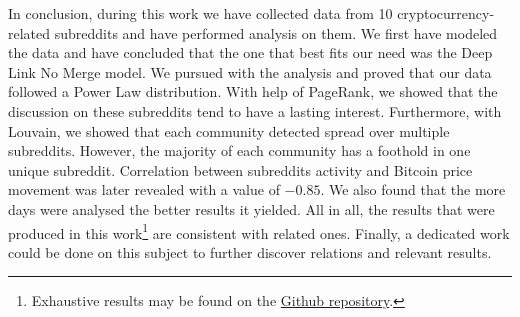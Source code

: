In conclusion, during this work we have collected data from 10 cryptocurrency-related subreddits and have performed analysis on them. We first have modeled the data and have concluded that the one that best fits our need was the Deep Link No Merge model. We pursued with the analysis and proved that our data followed a Power Law distribution. With help of PageRank, we showed that the discussion on these subreddits tend to have a lasting interest. Furthermore, with Louvain, we showed that each community detected spread over multiple subreddits. However, the majority of each community has a foothold in one unique subreddit. Correlation between subreddits activity and Bitcoin price movement was later revealed with a value of $-0.85$. We also found that the more days were analysed the better results it yielded. All in all, the results that were produced in this work\footnote{Exhaustive results may be found on the \href{https://github.com/fwicht/sma-project}{Github repository}.} are consistent with related ones. Finally, a dedicated work could be done on this subject to further discover relations and relevant results.
